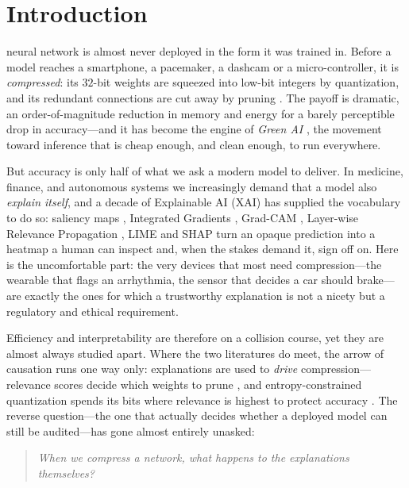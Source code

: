 \documentclass{ieeeaccess}
\begin{document}
\section{Introduction}
\label{sec:introduction}
 neural network is almost never deployed in the form it was trained
in. Before a model reaches a smartphone, a pacemaker, a dashcam or a
micro-controller, it is \emph{compressed}: its $32$-bit weights are squeezed into
low-bit integers by quantization, and its redundant connections are cut away by
pruning \cite{han2016deep,jacob2018quant,gholami2022survey}. The payoff is
dramatic, an order-of-magnitude reduction in memory and energy for a barely
perceptible drop in accuracy---and it has become the engine of \emph{Green AI}
\cite{schwartz2020green}, the movement toward inference that is cheap enough, and
clean enough, to run everywhere.

But accuracy is only half of what we ask a modern model to deliver. In medicine,
finance, and autonomous systems we increasingly demand that a model also
\emph{explain itself}, and a decade of Explainable AI (XAI) has supplied the
vocabulary to do so: saliency maps \cite{simonyan2014saliency}, Integrated
Gradients \cite{sundararajan2017ig}, Grad-CAM \cite{selvaraju2017gradcam},
Layer-wise Relevance Propagation \cite{bach2015lrp}, LIME \cite{ribeiro2016lime}
and SHAP \cite{lundberg2017shap} turn an opaque prediction into a heatmap a human
can inspect and, when the stakes demand it, sign off on. Here is the
uncomfortable part: the very devices that most need compression---the wearable
that flags an arrhythmia, the sensor that decides a car should brake---are
exactly the ones for which a trustworthy explanation is not a nicety but a
regulatory and ethical requirement.

Efficiency and interpretability are therefore on a collision course, yet they are
almost always studied apart. Where the two literatures do meet, the arrow of
causation runs one way only: explanations are used to \emph{drive} compression---
relevance scores decide which weights to prune \cite{yeom2021pruning}, and
entropy-constrained quantization spends its bits where relevance is highest to
protect accuracy \cite{becking2022ecq}. The reverse question---the one that
actually decides whether a deployed model can still be audited---has gone almost
entirely unasked:

\begin{quote}
\emph{When we compress a network, what happens to the explanations themselves?}
\end{quote}
\end{document}
